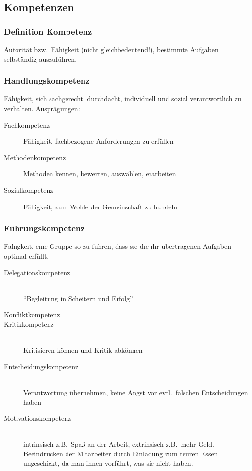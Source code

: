 \documentclass[a4paper, 12pt]{article}
\begin{document}
\subsection{Kompetenzen}

\subsubsection{Definition Kompetenz}
Autorität bzw.\ Fähigkeit (nicht gleichbedeutend!), bestimmte Aufgaben selbständig auszuführen.


\subsubsection{Handlungskompetenz}
Fähigkeit, sich sachgerecht, durchdacht, individuell und sozial verantwortlich zu verhalten. Ausprägungen:
\begin{description}
  \item[Fachkompetenz] Fähigkeit, fachbezogene Anforderungen zu erfüllen
  \item[Methodenkompetenz] Methoden kennen, bewerten, auswählen, erarbeiten
  \item[Sozialkompetenz] Fähigkeit, zum Wohle der Gemeinschaft zu handeln
\end{description}

\subsubsection{Führungskompetenz}
Fähigkeit, eine Gruppe so zu führen, dass sie die ihr übertragenen Aufgaben optimal erfüllt.
\begin{description}
  \item[Delegationskompetenz]~\\
    ``Begleitung in Scheitern und Erfolg''
  \item[Konfliktkompetenz]
  \item[Kritikkompetenz]~\\
    Kritisieren können und Kritik abkönnen
  \item[Entscheidungskompetenz]~\\
    Verantwortung übernehmen, keine Angst vor evtl.\ falschen Entscheidungen haben
  \item[Motivationskompetenz]~\\
    intrinsisch z.B.\ Spaß an der Arbeit, extrinsisch z.B.\ mehr Geld. Beeindrucken der Mitarbeiter durch Einladung zum teuren Essen ungeschickt, da man ihnen vorführt, was sie nicht haben.
\end{description}
\end{document}
